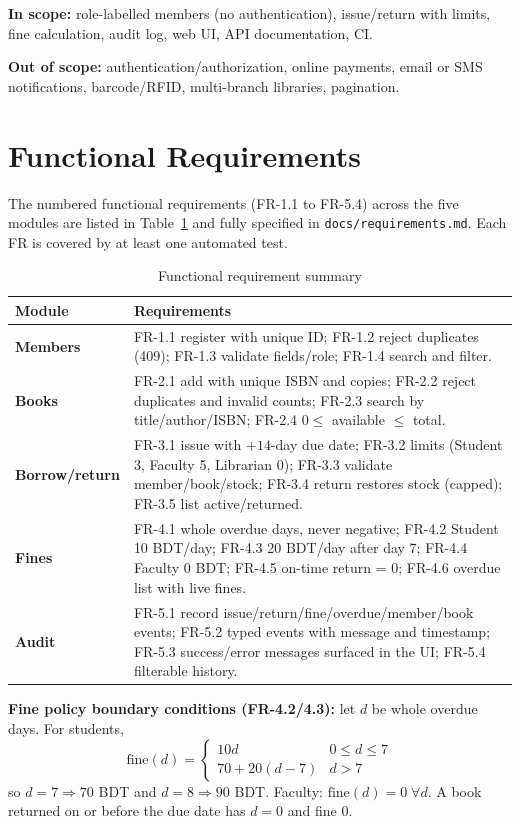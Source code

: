 \documentclass[12pt,a4paper]{article}
\begin{document}
\textbf{In scope:} role-labelled members (no authentication), issue/return
with limits, fine calculation, audit log, web UI, API documentation, CI.

\textbf{Out of scope:} authentication/authorization, online payments, email
or SMS notifications, barcode/RFID, multi-branch libraries, pagination.

\section{Functional Requirements}
The numbered functional requirements (FR-1.1 to FR-5.4) across the five
modules are listed in Table~\ref{tab:fr-summary} and fully specified in
\texttt{docs/requirements.md}. Each FR is covered by at least one automated
test.

\begin{table}[H]
\centering
\caption{Functional requirement summary}
\label{tab:fr-summary}
\begin{tabular}{>{\bfseries}p{2.2cm}p{10.5cm}}
\toprule
Module & Requirements \\
\midrule
Members & FR-1.1 register with unique ID; FR-1.2 reject duplicates (409);
FR-1.3 validate fields/role; FR-1.4 search and filter. \\
Books & FR-2.1 add with unique ISBN and copies; FR-2.2 reject duplicates and
invalid counts; FR-2.3 search by title/author/ISBN; FR-2.4
$0 \le$ available $\le$ total. \\
Borrow/return & FR-3.1 issue with $+14$-day due date; FR-3.2 limits
(Student 3, Faculty 5, Librarian 0); FR-3.3 validate member/book/stock;
FR-3.4 return restores stock (capped); FR-3.5 list active/returned. \\
Fines & FR-4.1 whole overdue days, never negative; FR-4.2 Student
10 BDT/day; FR-4.3 20 BDT/day after day 7; FR-4.4 Faculty 0 BDT;
FR-4.5 on-time return = 0; FR-4.6 overdue list with live fines. \\
Audit & FR-5.1 record issue/return/fine/overdue/member/book events;
FR-5.2 typed events with message and timestamp; FR-5.3 success/error
messages surfaced in the UI; FR-5.4 filterable history. \\
\bottomrule
\end{tabular}
\end{table}

\textbf{Fine policy boundary conditions (FR-4.2/4.3):}
let $d$ be whole overdue days. For students,
\[
\text{fine}(d) =
\begin{cases}
10d & 0 \le d \le 7\\
70 + 20(d-7) & d > 7
\end{cases}
\]
so $d=7 \Rightarrow 70$ BDT and $d=8 \Rightarrow 90$ BDT. Faculty:
$\text{fine}(d)=0\;\forall d$. A book returned on or before the due date has
$d=0$ and fine $0$.
\end{document}
